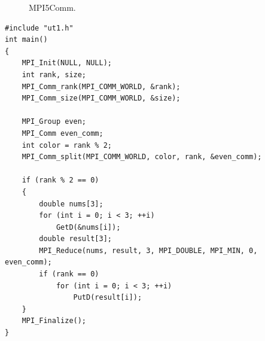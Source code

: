 \begin{figure}[htbp]%
    \centering
    \hfill%
    \caption{MPI5Comm.}%
    \label{mpi5comm}%
\end{figure}


\lstset{language=c++}
\begin{lstlisting}
#include "ut1.h"
int main()
{
	MPI_Init(NULL, NULL);
	int rank, size;
	MPI_Comm_rank(MPI_COMM_WORLD, &rank);
	MPI_Comm_size(MPI_COMM_WORLD, &size);

	MPI_Group even;
	MPI_Comm even_comm;
	int color = rank % 2;
	MPI_Comm_split(MPI_COMM_WORLD, color, rank, &even_comm);

	if (rank % 2 == 0)
	{
		double nums[3];
		for (int i = 0; i < 3; ++i)
			GetD(&nums[i]);
		double result[3];
		MPI_Reduce(nums, result, 3, MPI_DOUBLE, MPI_MIN, 0, even_comm);
		if (rank == 0)
			for (int i = 0; i < 3; ++i)
				PutD(result[i]);
	}
	MPI_Finalize();
}
\end{lstlisting}

